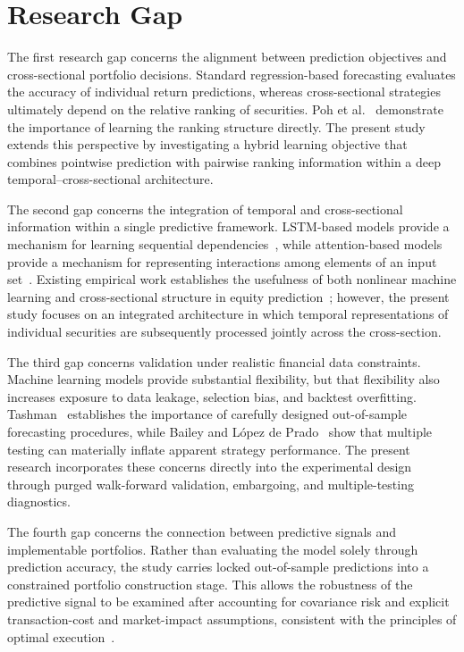 \section{Research Gap} \label{sec:research-gap}
The first research gap concerns the alignment between prediction objectives and cross-sectional portfolio decisions. Standard regression-based forecasting evaluates the accuracy of individual return predictions, whereas cross-sectional strategies ultimately depend on the relative ranking of securities. Poh et al.~\cite{Poh2021} demonstrate the importance of learning the ranking structure directly. The present study extends this perspective by investigating a hybrid learning objective that combines pointwise prediction with pairwise ranking information within a deep temporal--cross-sectional architecture.

\medskip

The second gap concerns the integration of temporal and cross-sectional information within a single predictive framework. LSTM-based models provide a mechanism for learning sequential dependencies~\cite{FischerKrauss2018}, while attention-based models provide a mechanism for representing interactions among elements of an input set~\cite{Vaswani2017}. Existing empirical work establishes the usefulness of both nonlinear machine learning and cross-sectional structure in equity prediction~\cite{Gu2020,Poh2021}; however, the present study focuses on an integrated architecture in which temporal representations of individual securities are subsequently processed jointly across the cross-section.

\medskip

The third gap concerns validation under realistic financial data constraints. Machine learning models provide substantial flexibility, but that flexibility also increases exposure to data leakage, selection bias, and backtest overfitting. Tashman~\cite{Tashman2000} establishes the importance of carefully designed out-of-sample forecasting procedures, while Bailey and López de Prado~\cite{BaileyLopezDePrado2014} show that multiple testing can materially inflate apparent strategy performance. The present research incorporates these concerns directly into the experimental design through purged walk-forward validation, embargoing, and multiple-testing diagnostics.

\medskip

The fourth gap concerns the connection between predictive signals and implementable portfolios. Rather than evaluating the model solely through prediction accuracy, the study carries locked out-of-sample predictions into a constrained portfolio construction stage. This allows the robustness of the predictive signal to be examined after accounting for covariance risk and explicit transaction-cost and market-impact assumptions, consistent with the principles of optimal execution~\cite{AlmgrenChriss2000}.

